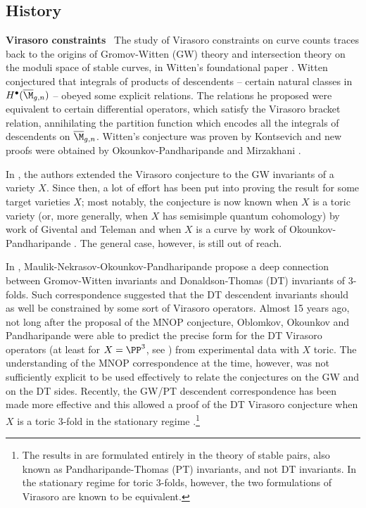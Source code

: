 \subsection{History}
\label{sec: history of Virasoro constraints }

\textbf{Virasoro constraints} \
The study of Virasoro constraints on curve counts traces back to the origins of Gromov-Witten (GW) theory and intersection theory on the moduli space of stable curves, in Witten's foundational paper \cite{witten}. Witten conjectured that integrals of products of descendents -- certain natural classes in $H^\bullet(\overline \M_{g,n})$ -- obeyed some explicit relations. The relations he proposed were equivalent to certain differential operators,  which satisfy the Virasoro bracket relation, annihilating the partition function which encodes all the integrals of descendents on $\overline \M_{g,n}$. Witten's conjecture was proven by Kontsevich \cite{kontsevich} and new proofs were obtained by Okounkov-Pandharipande \cite{OPwitten} and Mirzakhani \cite{mirzakhani}.

In \cite{ehx}, the authors extended the Virasoro conjecture to the GW invariants of a variety $X$. Since then, a lot of effort has been put into proving the result for some target varieties $X$; most notably, the conjecture is now known when $X$ is a toric variety (or, more generally, when $X$ has semisimple quantum cohomology) by work of Givental and Teleman \cite{givental,teleman} and when $X$ is a curve by work of Okounkov-Pandharipande \cite{OP}. The general case, however, is still out of reach.

In \cite{mnop1,mnop2}, Maulik-Nekrasov-Okounkov-Pandharipande propose a  deep connection between Gromov-Witten invariants and Donaldson-Thomas (DT) invariants of 3-folds. Such correspondence suggested that the DT descendent invariants should as well be constrained by some sort of Virasoro operators. Almost 15 years ago, not long after the proposal of the MNOP conjecture, Oblomkov, Okounkov and Pandharipande were able to predict the precise form for the DT Virasoro operators (at least for $X=\PP^3$, see \cite[Conjecture 8]{survey}) from experimental data with $X$ toric. The understanding of the MNOP correspondence at the time, however, was not sufficiently explicit to be used effectively to relate the conjectures on the GW and on the DT sides. Recently, the GW/PT descendent correspondence has been made more effective and this allowed a proof of the DT Virasoro conjecture when $X$ is a toric 3-fold in the stationary regime \cite{moop}.\footnote{The results in \cite{moop} are formulated entirely in the theory of stable pairs, also known as Pandharipande-Thomas (PT) invariants, and not DT invariants. In the stationary regime for toric 3-folds, however, the two formulations of Virasoro are known to be equivalent. }

